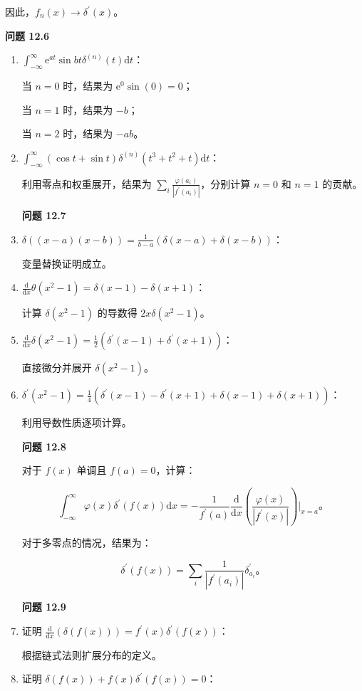 因此，\(f_n(x) \to \delta^{\prime}(x)\)。


\textbf{问题 12.6}

\begin{enumerate}

\item
  \(\int_{-\infty}^\infty \mathrm{e}^{a t} \sin b t \delta^{(n)}(t) \mathrm{d}t\)：


当 \(n=0\) 时，结果为 \(\mathrm{e}^{0} \sin(0) = 0\)；

当 \(n=1\) 时，结果为 \(-b\)；

当 \(n=2\) 时，结果为 \(-a b\)。


\item
  \(\int_{-\infty}^\infty (\cos t + \sin t) \delta^{(n)}(t^3 + t^2 + t) \mathrm{d}t\)：


利用零点和权重展开，结果为
\(\sum_i \frac{\varphi(a_i)}{|f^{\prime}(a_i)|}\)，分别计算 \(n=0\) 和
\(n=1\) 的贡献。


\textbf{问题 12.7}


\item
  \(\delta((x-a)(x-b)) = \frac{1}{b-a}(\delta(x-a) + \delta(x-b))\)：


变量替换证明成立。

\item
  \(\frac{\mathrm{d}}{\mathrm{d}x} \theta(x^2-1) = \delta(x-1) - \delta(x+1)\)：

计算 \(\delta(x^2-1)\) 的导数得 \(2x \delta(x^2-1)\)。


\item
  \(\frac{\mathrm{d}}{\mathrm{d}x} \delta(x^2-1) = \frac{1}{2}\left(\delta^{\prime}(x-1) + \delta^{\prime}(x+1)\right)\)：


直接微分并展开 \(\delta(x^2-1)\)。


\item
  \(\delta^{\prime}(x^2-1) = \frac{1}{4}\left(\delta^{\prime}(x-1) - \delta^{\prime}(x+1) + \delta(x-1) + \delta(x+1)\right)\)：


利用导数性质逐项计算。



\textbf{问题 12.8}

对于 \(f(x)\) 单调且 \(f(a) = 0\)，计算：

\[
\int_{-\infty}^\infty \varphi(x) \delta^{\prime}(f(x)) \mathrm{d}x = -\frac{1}{f^{\prime}(a)} \frac{\mathrm{d}}{\mathrm{d}x}\left(\frac{\varphi(x)}{|f^{\prime}(x)|}\right)\Big|_{x=a}。
\]

对于多零点的情况，结果为：

\[
\delta^{\prime}(f(x)) = \sum_i \frac{1}{|f^{\prime}(a_i)|} \delta_{a_i}^{\prime}。
\]


\textbf{问题 12.9}


\item
  证明
  \(\frac{\mathrm{d}}{\mathrm{d}x} (\delta(f(x))) = f^{\prime}(x) \delta^{\prime}(f(x))\)：


根据链式法则扩展分布的定义。


\item
  证明 \(\delta(f(x)) + f(x) \delta^{\prime}(f(x)) = 0\)：
\end{enumerate}

